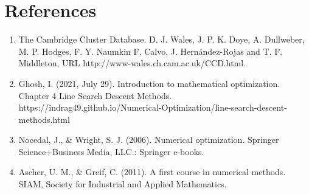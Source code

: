 \documentclass[11pt,onecolumn]{article}
\begin{document}
\newpage
\section{References}

\begin{enumerate}
\item
The Cambridge Cluster Database. D. J. Wales, J. P. K. Doye, A. Dullweber, M. P. Hodges, F. Y. Naumkin F. Calvo, J. Hernández-Rojas and T. F. Middleton, URL http://www-wales.ch.cam.ac.uk/CCD.html.

\item
Ghosh, I. (2021, July 29). Introduction to mathematical optimization. Chapter 4 Line Search Descent Methods. https://indrag49.github.io/Numerical-Optimization/line-search-descent-methods.html 

\item
Nocedal, J., \& Wright, S. J. (2006). Numerical optimization. Springer Science+Business Media, LLC.: Springer e-books.

\item
Ascher, U. M., \& Greif, C. (2011). A first course in numerical methods. SIAM, Society for Industrial and Applied Mathematics. 
\end{enumerate}


\end{document}
